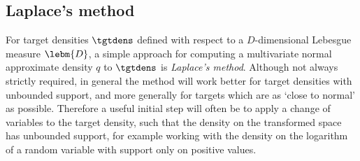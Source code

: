 \subsection{Laplace's method}

For target densities $\tgtdens$ defined with respect to a $D$-dimensional Lebesgue measure $\lebm{D}$, a simple approach for computing a multivariate normal approximate density $q$ to $\tgtdens$ is \emph{Laplace's method}. Although not always strictly required, in general the method will work better for target densities with unbounded support, and more generally for targets which are as `close to normal' as possible. Therefore a useful initial step will often be to apply a change of variables to the target density, such that the density on the transformed space has unbounded support, for example working with the density on the logarithm of a random variable with support only on positive values.

